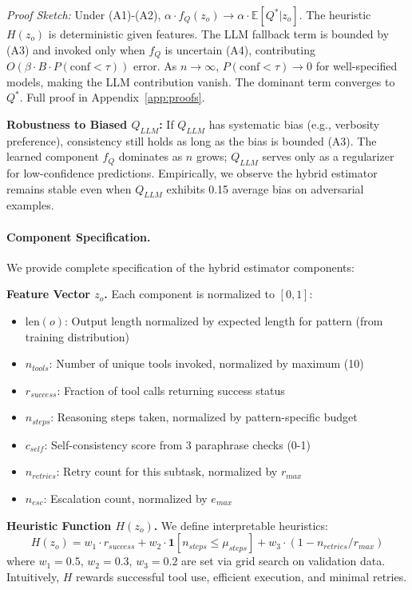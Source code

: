 \documentclass{article}
\theoremstyle{plain}
\theoremstyle{definition}
\theoremstyle{remark}
\begin{document}
\textit{Proof Sketch:} Under (A1)-(A2), $\alpha \cdot f_Q(z_o) \to \alpha \cdot \mathbb{E}[Q^* | z_o]$. The heuristic $H(z_o)$ is deterministic given features. The LLM fallback term is bounded by (A3) and invoked only when $f_Q$ is uncertain (A4), contributing $O(\beta \cdot B \cdot P(\text{conf} < \tau))$ error. As $n \to \infty$, $P(\text{conf} < \tau) \to 0$ for well-specified models, making the LLM contribution vanish. The dominant term converges to $Q^*$. Full proof in Appendix~\ref{app:proofs}.

\textbf{Robustness to Biased $Q_{LLM}$:} If $Q_{LLM}$ has systematic bias (e.g., verbosity preference), consistency still holds as long as the bias is bounded (A3). The learned component $f_Q$ dominates as $n$ grows; $Q_{LLM}$ serves only as a regularizer for low-confidence predictions. Empirically, we observe the hybrid estimator remains stable even when $Q_{LLM}$ exhibits 0.15 average bias on adversarial examples.

\paragraph{Component Specification.}
We provide complete specification of the hybrid estimator components:

\textbf{Feature Vector $z_o$.} Each component is normalized to $[0,1]$:
\begin{itemize}[nosep,leftmargin=*]
	\item $\text{len}(o)$: Output length normalized by expected length for pattern (from training distribution)
	\item $n_{tools}$: Number of unique tools invoked, normalized by maximum (10)
	\item $r_{success}$: Fraction of tool calls returning success status
	\item $n_{steps}$: Reasoning steps taken, normalized by pattern-specific budget
	\item $c_{self}$: Self-consistency score from 3 paraphrase checks (0-1)
	\item $n_{retries}$: Retry count for this subtask, normalized by $r_{max}$
	\item $n_{esc}$: Escalation count, normalized by $e_{max}$
\end{itemize}

\textbf{Heuristic Function $H(z_o)$.} We define interpretable heuristics:
\begin{equation}
	H(z_o) = w_1 \cdot r_{success} + w_2 \cdot \mathbf{1}[n_{steps} \leq \mu_{steps}] + w_3 \cdot (1 - n_{retries}/r_{max})
\end{equation}
where $w_1 = 0.5$, $w_2 = 0.3$, $w_3 = 0.2$ are set via grid search on validation data. Intuitively, $H$ rewards successful tool use, efficient execution, and minimal retries.
\end{document}

